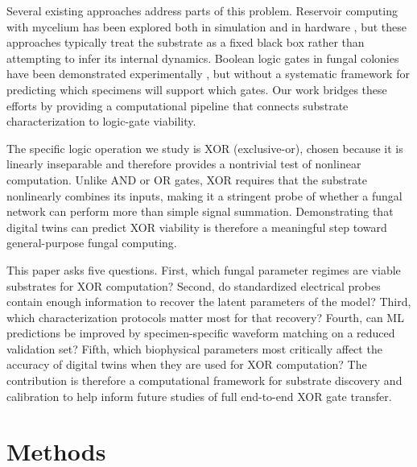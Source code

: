 \documentclass[letterpaper]{article}
\begin{document}
Several existing approaches address parts of this problem. Reservoir computing with mycelium has been explored both in simulation \citep{tompris2025mycelium} and in hardware \citep{telhan2025morphologically}, but these approaches typically treat the substrate as a fixed black box rather than attempting to infer its internal dynamics. Boolean logic gates in fungal colonies have been demonstrated experimentally \citep{adamatzky2020boolean, roberts2022mining}, but without a systematic framework for predicting which specimens will support which gates. Our work bridges these efforts by providing a computational pipeline that connects substrate characterization to logic-gate viability.

The specific logic operation we study is XOR (exclusive-or), chosen because it is linearly inseparable and therefore provides a nontrivial test of nonlinear computation. Unlike AND or OR gates, XOR requires that the substrate nonlinearly combines its inputs, making it a stringent probe of whether a fungal network can perform more than simple signal summation. Demonstrating that digital twins can predict XOR viability is therefore a meaningful step toward general-purpose fungal computing.

This paper asks five questions. First, which fungal parameter regimes are viable substrates for XOR computation? Second, do standardized electrical probes contain enough information to recover the latent parameters of the model? Third, which characterization protocols matter most for that recovery? Fourth, can ML predictions be improved by specimen-specific waveform matching on a reduced validation set? Fifth, which biophysical parameters most critically affect the accuracy of digital twins when they are used for XOR computation? The contribution is therefore a computational framework for substrate discovery and calibration to help inform future studies of full end-to-end XOR gate transfer.

\section{Methods}
\end{document}
